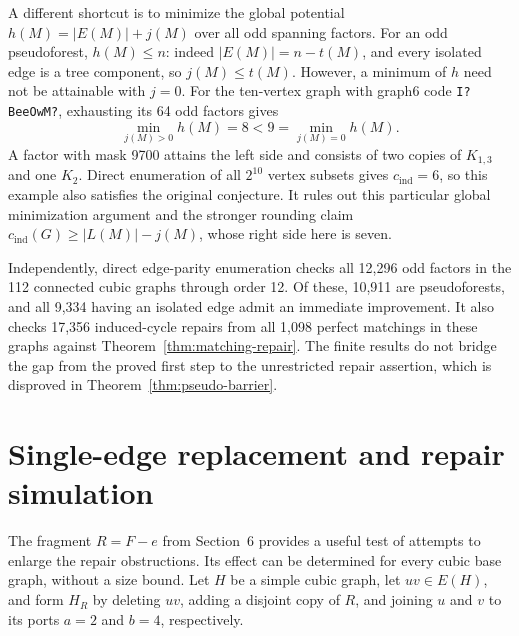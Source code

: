 \documentclass[11pt]{article}
\newcommand{\cind}{c_{\mathrm{ind}}}
\begin{document}
A different shortcut is to minimize the global potential
$h(M)=|E(M)|+j(M)$ over all odd spanning factors. For an odd
pseudoforest, $h(M)\leq n$: indeed $|E(M)|=n-t(M)$, and every
isolated edge is a tree component, so $j(M)\leq t(M)$.
However, a minimum of $h$ need not be attainable with $j=0$.
For the ten-vertex graph with graph6 code \texttt{I?BeeOwM?},
exhausting its 64 odd factors gives
\[
 \min_{j(M)>0}h(M)=8<9=\min_{j(M)=0}h(M).
\]
A factor with mask 9700 attains the left side and consists of
two copies of $K_{1,3}$ and one $K_2$. Direct enumeration of all
$2^{10}$ vertex subsets gives $\cind=6$, so this example also
satisfies the original conjecture. It rules out this particular
global minimization argument and the stronger rounding claim
$\cind(G)\geq |L(M)|-j(M)$, whose right side here is seven.

Independently, direct edge-parity enumeration checks all 12,296
odd factors in the 112 connected cubic graphs through order 12.
Of these, 10,911 are pseudoforests, and all 9,334 having an
isolated edge admit an immediate improvement. It also checks
17,356 induced-cycle repairs from all 1,098 perfect matchings in
these graphs against Theorem~\ref{thm:matching-repair}.
The finite results do not bridge the gap from the proved first
step to the unrestricted repair assertion, which is disproved in
Theorem~\ref{thm:pseudo-barrier}.

\section{Single-edge replacement and repair simulation}
The fragment $R=F-e$ from Section~6 provides a useful test of
attempts to enlarge the repair obstructions. Its effect can be
determined for every cubic base graph, without a size bound.
Let $H$ be a simple cubic graph, let $uv\in E(H)$, and form
$H_R$ by deleting $uv$, adding a disjoint copy of $R$, and joining
$u$ and $v$ to its ports $a=2$ and $b=4$, respectively.
\end{document}
